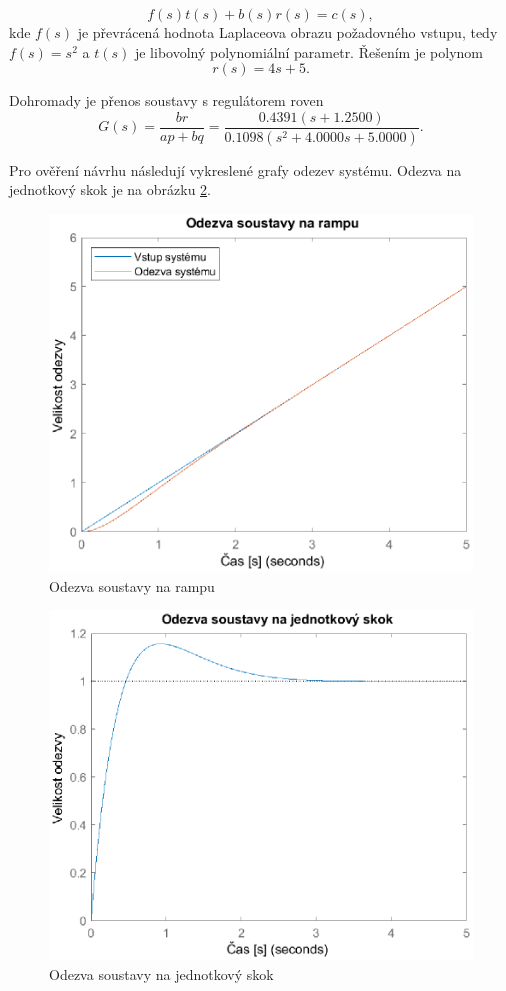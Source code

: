 \documentclass[twoside]{article}
\begin{document}
\begin{equation}
	f(s)t(s) + b(s)r(s) = c(s),
\end{equation}
kde $f(s)$ je převrácená hodnota Laplaceova obrazu požadovného vstupu, tedy $f(s) = s^2$ a $t(s)$ je libovolný polynomiální 
parametr. Řešením je polynom 
\begin{equation}
	r(s) = 4s+5.
\end{equation}

Dohromady je přenos soustavy s regulátorem roven
\begin{equation}
	G(s) = \frac{br}{ap+bq} = \frac{0.4391(s+1.2500)}{ 0.1098(s^2+4.0000s+5.0000)}.
\end{equation}

Pro ověření návrhu následují vykreslené grafy odezev systému. Odezva na jednotkový skok je na obrázku \ref{fig:step}.

\begin{figure}[htbp]
	\centering
	\includegraphics[width=.6\linewidth]{ramp_response.eps}
	\caption{Odezva soustavy na rampu}
	\label{fig:rampa}
\end{figure}
\begin{figure}[htbp]
	\centering
	\includegraphics[width=.6\linewidth]{step_response.eps}
	\caption{Odezva soustavy na jednotkový skok}
	\label{fig:step}
\end{figure}
\end{document}
